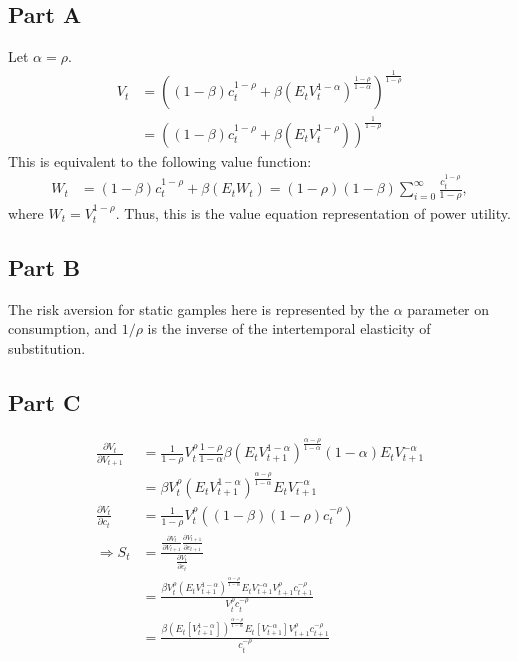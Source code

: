 \documentclass[11pt]{article} %
\begin{document}
\subsection{Part A}
Let $\alpha = \rho$.
\begin{align*}
V_t &= \left( (1-\beta) c_t^{1-\rho} + \beta(E_tV_t^{1-\alpha})^{\frac{1-\rho}{1-\alpha}} \right)^{\frac{1}{1-\rho}}\\
&= \left( (1-\beta) c_t^{1-\rho} + \beta(E_tV_t^{1-\rho}) \right)^{\frac{1}{1-\rho}}
\end{align*}
This is equivalent to the following value function:
\begin{align*}
W_t &= (1-\beta) c_t^{1-\rho} + \beta(E_tW_t) = (1-\rho)(1-\beta)\sum_{i=0}^{\infty}\frac{c_t^{1-\rho}}{1-\rho},
\end{align*}
where $W_t = V_t^{1-\rho}.$ Thus, this is the value equation representation of power utility.
\subsection{Part B}
The risk aversion for static gamples here is represented by the $\alpha$ parameter on consumption, and $1/\rho$ is the inverse of the intertemporal elasticity of substitution.
\subsection{Part C}
\begin{align*}
\frac{\partial V_t}{\partial V_{t+1}} &= \frac{1}{1-\rho}V_t^{\rho}\frac{1-\rho}{1-\alpha}\beta (E_tV_{t+1}^{1-\alpha})^{\frac{\alpha-\rho}{1-\alpha}}(1-\alpha)E_tV_{t+1}^{-\alpha} \\
&= \beta V_t^{\rho}  (E_tV_{t+1}^{1-\alpha})^{\frac{\alpha-\rho}{1-\alpha}} E_tV_{t+1}^{-\alpha}\\
\frac{\partial V_{t}}{\partial c_{t}} &=\frac{1}{1-\rho}V_t^{\rho}((1-\beta)(1-\rho)c_t^{-\rho}) \\
\Rightarrow S_t &= \frac{\frac{\partial V_t}{\partial V_{t+1}}\frac{\partial V_{t+1}}{\partial c_{t+1}} }{\frac{\partial V_{t}}{\partial c_{t}} }\\
&= \frac{ \beta V_t^{\rho}  (E_tV_{t+1}^{1-\alpha})^{\frac{\alpha-\rho}{1-\alpha}} E_tV_{t+1}^{-\alpha}V_{t+1}^{\rho}c_{t+1}^{-\rho} }{V_t^{\rho}c_t^{-\rho} }\\
&= \frac{ \beta  (E_t[V_{t+1}^{1-\alpha}])^{\frac{\alpha-\rho}{1-\alpha}} E_t[V_{t+1}^{-\alpha}]V_{t+1}^{\rho}c_{t+1}^{-\rho} }{c_t^{-\rho} } 
\end{align*}
\end{document}
